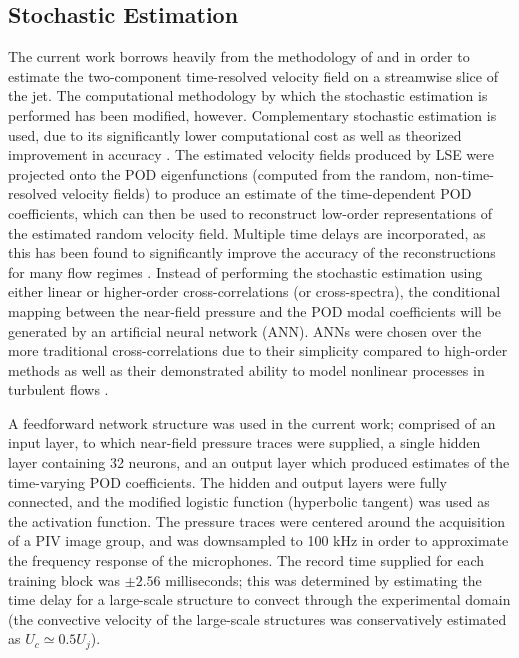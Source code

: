 \subsection{Stochastic Estimation}
The current work borrows heavily from the methodology of \citet{Tinney2008b} and \citet{Sinha2010} in order to estimate the two-component time-resolved velocity field on a streamwise slice of the jet.
The computational methodology by which the stochastic estimation is performed has been modified, however.
Complementary stochastic estimation is used, due to its significantly lower computational cost as well as theorized improvement in accuracy \citep{Bonnet1994}.
The estimated velocity fields produced by LSE were projected onto the POD eigenfunctions (computed from the random, non-time-resolved velocity fields) to produce an estimate of the time-dependent POD coefficients, which can then be used to reconstruct low-order representations of the estimated random velocity field.
Multiple time delays are incorporated, as this has been found to significantly improve the accuracy of the reconstructions for many flow regimes \citep{Ewing1997,Tinney2006,Tinney2008b,Durgesh2010}.
Instead of performing the stochastic estimation using either linear or higher-order cross-correlations (or cross-spectra), the conditional mapping between the near-field pressure and the POD modal coefficients will be generated by an artificial neural network (ANN).
ANNs were chosen over the more traditional cross-correlations due to their simplicity compared to high-order methods as well as their demonstrated ability to model nonlinear processes in turbulent flows \citep{Lasagna2015}.

A feedforward network structure was used in the current work; comprised of an input layer, to which near-field pressure traces were supplied, a single hidden layer containing 32 neurons, and an output layer which produced estimates of the time-varying POD coefficients. 
The hidden and output layers were fully connected, and the modified logistic function (hyperbolic tangent) was used as the activation function.
The pressure traces were centered around the acquisition of a PIV image group, and was downsampled to 100 kHz in order to approximate the frequency response of the microphones.
The record time supplied for each training block was $\pm 2.56$ milliseconds; this was determined by estimating the time delay for a large-scale structure to convect through the experimental domain (the convective velocity of the large-scale structures was conservatively estimated as $U_c \simeq 0.5 U_j$).


